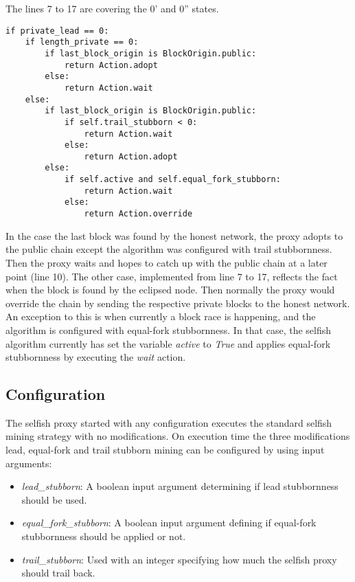 The lines 7 to 17 are covering the 0' and 0'' states.

\begin{minipage}{\linewidth}
\begin{lstlisting}[caption=Part of the selfish mining algorithm where private lead is zero, label={lst:algo}, basicstyle=\ttfamily, captionpos=b]
if private_lead == 0:
    if length_private == 0:
        if last_block_origin is BlockOrigin.public:
            return Action.adopt
        else:
            return Action.wait
    else:
        if last_block_origin is BlockOrigin.public:
            if self.trail_stubborn < 0:
                return Action.wait
            else:
                return Action.adopt
        else:
            if self.active and self.equal_fork_stubborn:
                return Action.wait
            else:
                return Action.override
\end{lstlisting}
\end{minipage}

In the case the last block was found by the honest network, the proxy adopts to the public chain except the algorithm was configured with trail stubbornness.
Then the proxy waits and hopes to catch up with the public chain at a later point (line 10).
The other case, implemented from line 7 to 17, reflects the fact when the block is found by the eclipsed node.
Then normally the proxy would override the chain by sending the respective private blocks to the honest network.
An exception to this is when currently a block race is happening, and the algorithm is configured with equal-fork stubbornness.
In that case, the selfish algorithm currently has set the variable \textit{active} to \textit{True} and applies equal-fork stubbornness by executing the \textit{wait} action.

\subsection{Configuration}

The selfish proxy started with any configuration executes the standard selfish mining strategy with no modifications.
On execution time the three modifications lead, equal-fork and trail stubborn mining can be configured by using input arguments:

\begin{itemize}
	\item \textit{lead\_stubborn}:
	A boolean input argument determining if lead stubbornness should be used. 
	\item \textit{equal\_fork\_stubborn}:
	A boolean input argument defining if equal-fork stubbornness should be applied or not.
	\item \textit{trail\_stubborn}:
	Used with an integer specifying how much the selfish proxy should trail back.
\end{itemize}
